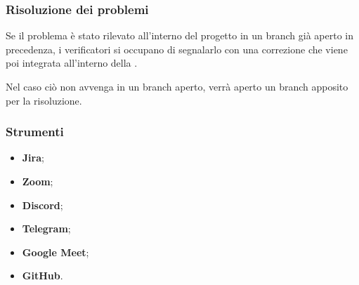 \subsubsection{Risoluzione dei problemi}
\par Se il problema è stato rilevato all'interno del progetto in un branch già aperto in precedenza, i verificatori si occupano di segnalarlo con una correzione che viene poi integrata all'interno della . 
\par Nel caso ciò non avvenga in un branch aperto, verrà aperto un branch apposito per la risoluzione. 

\subsubsection{Strumenti}
\IntroStrumenti
\begin{itemize}
    \item \textbf{Jira};
    \item \textbf{Zoom};
    \item \textbf{Discord};
    \item \textbf{Telegram};
    \item \textbf{Google Meet};
    \item \textbf{GitHub}.
\end{itemize}
